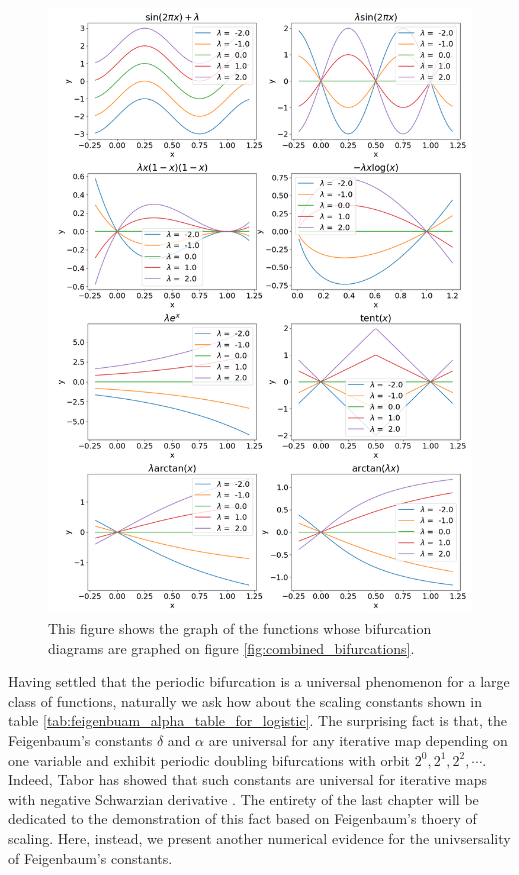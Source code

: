 \begin{figure}
	\centering
	\includegraphics[width=\textwidth]{./figures/combined_functions.png}
	\caption{
		This figure shows the graph of the functions whose bifurcation diagrams are graphed on figure \ref{fig:combined_bifurcations}.
	}
	\label{fig:combined_bifurcations_functions_graph}
\end{figure}


Having settled that the periodic bifurcation is a universal phenomenon for a large class of functions, naturally we ask how about the scaling constants shown in table \ref{tab:feigenbuam_alpha_table_for_logistic}.
The surprising fact is that, the Feigenbaum's constants $\delta$ and $\alpha$ are universal for any iterative map depending on one variable and exhibit periodic doubling bifurcations with orbit $2^0, 2^1, 2^2, \cdots$. 
Indeed, Tabor has showed that such constants are universal for iterative maps with negative Schwarzian derivative \cite{Tabor}.
The entirety of the last chapter will be dedicated to the demonstration of this fact based on Feigenbaum's thoery of scaling. 
Here, instead, we present another numerical evidence for the univsersality of Feigenbaum's constants.

